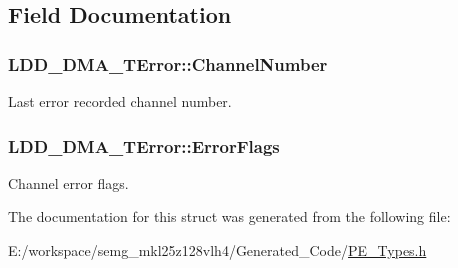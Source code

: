 \subsection{Field Documentation}
\hypertarget{struct_l_d_d___d_m_a___t_error_abc8d0c6909178bc7fe3957b7c01afd08}{
\subsubsection[{Channel\-Number}]{ L\-D\-D\-\_\-\-D\-M\-A\-\_\-\-T\-Error\-::\-Channel\-Number}}\label{struct_l_d_d___d_m_a___t_error_abc8d0c6909178bc7fe3957b7c01afd08}
Last error recorded channel number. \hypertarget{struct_l_d_d___d_m_a___t_error_a9dd0a645e1763b4daa0058b1b29c4ad7}{
\subsubsection[{Error\-Flags}]{ L\-D\-D\-\_\-\-D\-M\-A\-\_\-\-T\-Error\-::\-Error\-Flags}}\label{struct_l_d_d___d_m_a___t_error_a9dd0a645e1763b4daa0058b1b29c4ad7}
Channel error flags. 

The documentation for this struct was generated from the following file\-:\begin{DoxyCompactItemize}
\item 
E\-:/workspace/semg\-\_\-mkl25z128vlh4/\-Generated\-\_\-\-Code/\hyperlink{_p_e___types_8h}{P\-E\-\_\-\-Types.\-h}\end{DoxyCompactItemize}
